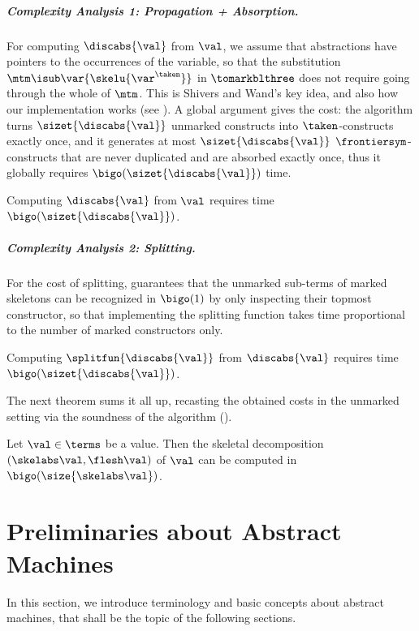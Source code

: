 \subparagraph{Complexity Analysis 1: Propagation + Absorption.} For computing $\discabs{\val}$ from $\val$, we assume that abstractions have pointers to the occurrences of the variable, so that the substitution $\mtm\isub\var{\skelu{\var^\taken}}$ in $\tomarkblthree$ does not require going through the whole of $\mtm$. This is Shivers and Wand's key idea, and also how our implementation works (see ). A global argument gives the cost: the algorithm turns $\sizet{\discabs{\val}}$ unmarked constructs into $\taken$-constructs exactly once, and it generates at most $\sizet{\discabs{\val}}$ $\frontiersym$-constructs that are never duplicated and are absorbed exactly once, thus it globally requires $\bigo(\sizet{\discabs{\val}})$ time.
\begin{lemma}
Computing $\discabs{\val}$ from $\val$ requires time $\bigo(\sizet{\discabs{\val}})$.
\end{lemma}

\subparagraph{Complexity Analysis 2: Splitting.} For the cost of splitting,  guarantees that the unmarked sub-terms of marked skeletons can be recognized in $\bigo(1)$ by only inspecting their topmost constructor, so that implementing the splitting function takes time proportional to the number of marked constructors only.

\begin{lemma}
Computing $\splitfun{\discabs{\val}}$ from $\discabs{\val}$ requires time $\bigo(\sizet{\discabs{\val}})$.
\end{lemma}

The next theorem sums it all up, recasting the obtained costs in the unmarked setting via the soundness of the algorithm ().
\begin{theorem}
Let $\val\in\terms$ be a value. Then the skeletal decomposition $(\skelabs\val,\flesh\val)$ of $\val$ can be computed in $\bigo(\size{\skelabs\val})$.
\end{theorem}


\section{Preliminaries about Abstract Machines}
\label{sect:prel-machines}
In this section, we introduce terminology and basic concepts about abstract machines, that shall be the topic of the following sections.

